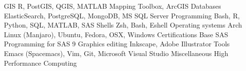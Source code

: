 \begin{cvtechskills}
    \cvtechskill    
        {GIS}
        {R, PostGIS, QGIS, MATLAB Mapping Toolbox, ArcGIS}
        {}
        {}
    \cvtechskill    
        {Databases}
        {ElasticSearch, PostgreSQL, MongoDB, MS SQL Server}
        {}
        {}
    \cvtechskill    
        {Programming}
        {Bash, R, Python, SQL, MATLAB, SAS}
        {}
        {}
    \cvtechskill    
        {Shells}
        {Zsh, Bash, Eshell}
        {}
        {}
    \cvtechskill    
        {Operating systems}
        {Arch Linux (Manjaro), Ubuntu, Fedora, OSX, Windows}
        {}
        {}  
    \cvtechskill
        {Certifications}
        {Base SAS Programming for SAS 9}
        {}
        {}
    \cvtechskill
        {Graphics editing}
        {Inkscape, Adobe Illustrator}
        {}
        {}
    \cvtechskill
        {Tools}
        {Emacs (Spacemacs), Vim, Git, Microsoft Visual Studio}
        {}
        {}
    \cvtechskill
        {Miscellaneous}
        {High Performance Computing}
        {}
        {}
\end{cvtechskills}